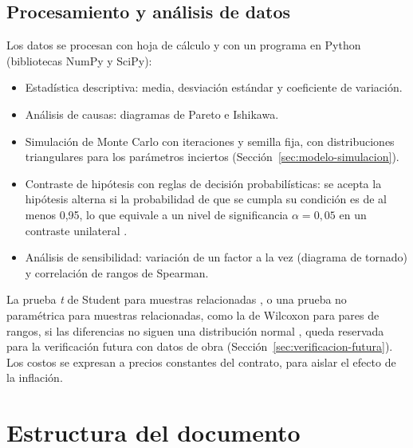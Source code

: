 \subsection{Procesamiento y análisis de datos}
Los datos se procesan con hoja de cálculo y con un programa en Python (bibliotecas NumPy y SciPy):
\begin{itemize}
  \item Estadística descriptiva: media, desviación estándar y coeficiente de variación.
  \item Análisis de causas: diagramas de Pareto e Ishikawa.
  \item Simulación de Monte Carlo con \MCiter{} iteraciones y semilla fija, con distribuciones triangulares para los parámetros inciertos (Sección~\ref{sec:modelo-simulacion}).
  \item Contraste de hipótesis con reglas de decisión probabilísticas: se acepta la hipótesis alterna si la probabilidad de que se cumpla su condición es de al menos 0,95, lo que equivale a un nivel de significancia $\alpha = 0{,}05$ en un contraste unilateral \parencite[p.~342]{hernandez2018}.
  \item Análisis de sensibilidad: variación de un factor a la vez (diagrama de tornado) y correlación de rangos de Spearman.
\end{itemize}

La prueba \emph{t} de Student para muestras relacionadas \parencite[pp.~352--353, 372]{hernandez2018}, o una prueba no paramétrica para muestras relacionadas, como la de Wilcoxon para pares de rangos, si las diferencias no siguen una distribución normal \parencite[pp.~362, 372]{hernandez2018}, queda reservada para la verificación futura con datos de obra (Sección~\ref{sec:verificacion-futura}). Los costos se expresan a precios constantes del contrato, para aislar el efecto de la inflación.

\section{Estructura del documento}


